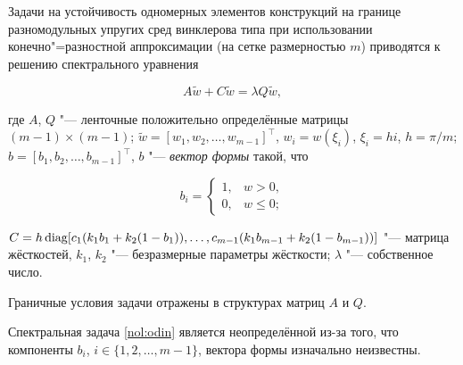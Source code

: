 




\maketitle






Задачи на устойчивость одномерных элементов конструкций на границе разномодульных упругих сред винклерова типа при использовании конечно"=разностной аппроксимации (на сетке размерностью $m$) приводятся к решению спектрального уравнения 

\begin{equation}

\label{nol:odin}

A\tilde{w}+C\tilde{w}=\lambda Q\tilde{w}, 

\end{equation}

где $A$, $Q$ "---  ленточные положительно определённые матрицы $(m-1)\times(m-1)$; $\tilde{w}=[w_1, w_2, \ldots, w_{m-1}]^\top$, $w_i=w(\xi_i)$, $\xi_{i}=hi$, $h=\pi/m$; $b=[b_1, b_2, \ldots, b_{m-1}]^\top$, $b$ "--- \textit{вектор формы} такой, что

\begin{equation}\label{nol:dva}

b_i=

\begin{cases}

1, & w>0,\\

0, & w\leq0;

\end{cases}

\end{equation}

$C=h\, {\rm diag}[c_1(k_1b_1+k_2(1-b_1)), \ldots ,c_{m-1}(k_1b_{m-1}+k_2(1-b_{m-1}))]$ "--- матрица жёсткостей, $k_1$, $k_2$ "--- безразмерные параметры жёсткости; $\lambda$ "--- собственное число.



Граничные условия задачи отражены в структурах матриц $A$ и $Q$.



Спектральная задача \eqref{nol:odin} является неопределённой из-за того, что компоненты $b_i$, $i\in\{1, 2,\dots,m-1\}$, вектора формы изначально неизвестны. 

